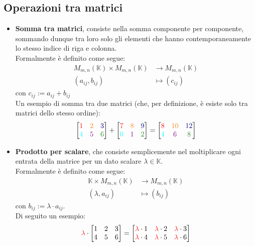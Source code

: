 \documentclass[12pt]{report}
\newcommand{\K}{\mathbb{K}}
\begin{document}
	\subsection{Operazioni tra matrici}
	\begin{itemize}
		\item \textbf{Somma tra matrici}, consiste nella somma componente per componente, sommando dunque tra loro solo gli elementi che hanno contemporaneamente lo stesso indice di riga e colonna.\\
		Formalmente è definito come segue:
		\[
			\begin{aligned}
				M_{m,n}(\K) \times M_{m,n}(\K) &\to M_{m,n}(\K)\\
				(a_{ij}, b_{ij}) &\mapsto (c_{ij})	
			\end{aligned}
		\]
		con $c_{ij} := a_{ij} + b_{ij}$\\
		Un esempio di somma tra due matrici (che, per definizione, è esiste solo tra matrici dello stesso ordine):
		\[
			\begin{bmatrix}
				\textcolor{Red}{1} & \textcolor{BurntOrange}{2} & \textcolor{NavyBlue}{3} \\
				\textcolor{Cyan}{4} & \textcolor{Purple}{5} & \textcolor{ForestGreen}{6}
			\end{bmatrix}
			+
			\begin{bmatrix}
				\textcolor{Red}{7} & \textcolor{BurntOrange}{8} & \textcolor{NavyBlue}{9} \\
				\textcolor{Cyan}{0} & \textcolor{Purple}{1} & \textcolor{ForestGreen}{2}
			\end{bmatrix}
			=
			\begin{bmatrix}
				\textcolor{Red}{8} & \textcolor{BurntOrange}{10} & \textcolor{NavyBlue}{12} \\
				\textcolor{Cyan}{4} & \textcolor{Purple}{6} & \textcolor{ForestGreen}{8}
			\end{bmatrix}
		\]
		
		\item \textbf{Prodotto per scalare}, che consiste semplicemente nel moltiplicare ogni entrata della matrice per un dato scalare $\lambda \in \K$.\\
		Formalmente è definito come segue:
		\[
			\begin{aligned}
				\K \times M_{m,n}(\K) &\to M_{m,n}(\K)\\
				(\lambda, a_{ij}) &\mapsto (b_{ij})
			\end{aligned}
		\]
		con $b_{ij} := \lambda \cdot a_{ij}$.\\
		Di seguito un esempio:
		\[
			\textcolor{Red}{\lambda} \cdot
			\begin{bmatrix}
				1 & 2 & 3\\
				4 & 5 & 6
			\end{bmatrix}
			= 
			\begin{bmatrix}
				\textcolor{Red}{\lambda} \cdot1 & \textcolor{Red}{\lambda} \cdot2 & \textcolor{Red}{\lambda} \cdot3\\
				\textcolor{Red}{\lambda} \cdot4 & \textcolor{Red}{\lambda} \cdot5 & \textcolor{Red}{\lambda} \cdot6
			\end{bmatrix}
		\]
		

\end{itemize}
\end{document}
